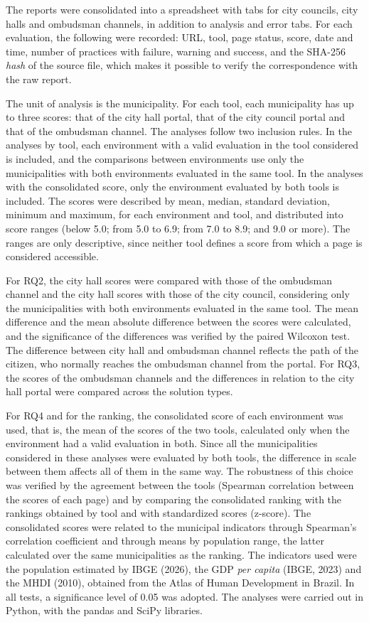 \documentclass[12pt]{article}
\begin{document}
The reports were consolidated into a spreadsheet with tabs for city councils, city halls and ombudsman channels, in addition to analysis and error tabs. For each evaluation, the following were recorded: URL, tool, page status, score, date and time, number of practices with failure, warning and success, and the SHA-256 \textit{hash} of the source file, which makes it possible to verify the correspondence with the raw report.

The unit of analysis is the municipality. For each tool, each municipality has up to three scores: that of the city hall portal, that of the city council portal and that of the ombudsman channel. The analyses follow two inclusion rules. In the analyses by tool, each environment with a valid evaluation in the tool considered is included, and the comparisons between environments use only the municipalities with both environments evaluated in the same tool. In the analyses with the consolidated score, only the environment evaluated by both tools is included. The scores were described by mean, median, standard deviation, minimum and maximum, for each environment and tool, and distributed into score ranges (below 5.0; from 5.0 to 6.9; from 7.0 to 8.9; and 9.0 or more). The ranges are only descriptive, since neither tool defines a score from which a page is considered accessible.

For RQ2, the city hall scores were compared with those of the ombudsman channel and the city hall scores with those of the city council, considering only the municipalities with both environments evaluated in the same tool. The mean difference and the mean absolute difference between the scores were calculated, and the significance of the differences was verified by the paired Wilcoxon test. The difference between city hall and ombudsman channel reflects the path of the citizen, who normally reaches the ombudsman channel from the portal. For RQ3, the scores of the ombudsman channels and the differences in relation to the city hall portal were compared across the solution types.

For RQ4 and for the ranking, the consolidated score of each environment was used, that is, the mean of the scores of the two tools, calculated only when the environment had a valid evaluation in both. Since all the municipalities considered in these analyses were evaluated by both tools, the difference in scale between them affects all of them in the same way. The robustness of this choice was verified by the agreement between the tools (Spearman correlation between the scores of each page) and by comparing the consolidated ranking with the rankings obtained by tool and with standardized scores (z-score). The consolidated scores were related to the municipal indicators through Spearman's correlation coefficient and through means by population range, the latter calculated over the same municipalities as the ranking. The indicators used were the population estimated by IBGE (2026), the GDP \textit{per capita} (IBGE, 2023) and the MHDI (2010), obtained from the Atlas of Human Development in Brazil. In all tests, a significance level of 0.05 was adopted. The analyses were carried out in Python, with the pandas and SciPy libraries.
\end{document}
